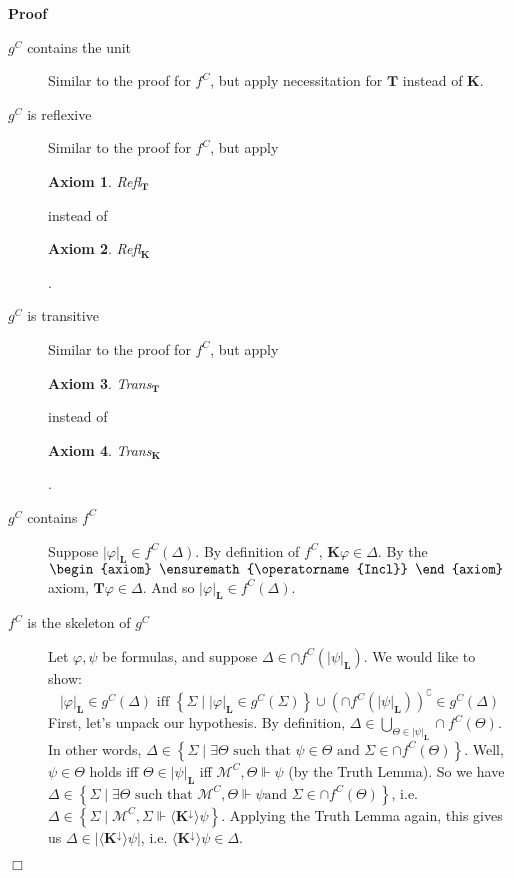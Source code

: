 \documentclass{article}
\newcommand{\infixiff}{\text{ iff }}
\newcommand{\tmmathbf}[1]{\ensuremath{\boldsymbol{#1}}}
\newcommand{\tmop}[1]{\ensuremath{\operatorname{#1}}}
\newenvironment{proof}{\noindent\textbf{Proof\ }}{\hspace*{\fill}$\Box$\medskip}
\newtheorem{axiom}{Axiom}
\providecommand{\infixiff}{\mathbin{\text{ iff }}}
\newcommand{\Model}{\ensuremath{\mathcal{M}}}
\newcommand{\Logic}{\ensuremath{\tmmathbf{\text{L}}}}
\newcommand{\Know}{\tmmathbf{\text{K}}}
\newcommand{\diaKnownby}{\langle \tmmathbf{\text{K}^{\downarrow}} \rangle}
\newcommand{\Typ}{\ensuremath{\tmmathbf{\text{T}}}}
\begin{document}
\begin{proof}
\begin{description}
    \item[$g^C$ contains the unit] Similar to the proof for $f^C$, but apply
    necessitation for $\Typ$ instead of $\Know$.
    
    \item[$g^C$ is reflexive] Similar to the proof for $f^C$, but apply
    \begin{axiom}
      Refl$_{\Typ}$
    \end{axiom} instead of \begin{axiom}
      Refl$_{\Know}$
    \end{axiom}.
    
    \item[$g^C$ is transitive] Similar to the proof for $f^C$, but apply
    \begin{axiom}
      Trans$_{\Typ}$
    \end{axiom} instead of \begin{axiom}
      Trans$_{\Know}$
    \end{axiom}.
    
    \item[$g^C$ contains $f^C$] Suppose $| \varphi |_{\Logic} \in f^C
    (\Delta)$. By definition of $f^C$, $\Know \varphi \in \Delta$. By the
    $\begin{axiom}
      \tmop{Incl}
    \end{axiom}$ axiom, $\Typ \varphi \in \Delta$. And so $| \varphi
    |_{\Logic} \in f^C (\Delta)$.
    
    \item[$f^C$ is the skeleton of $g^C$] Let $\varphi, \psi$ be formulas, and
    suppose $\Delta \in \cap f^C \left( | \psi |_{\Logic} \right)$. We would
    like to show:
    \[ | \varphi |_{\Logic} \in g^C (\Delta) \infixiff \left\{ \Sigma \mid |
       \varphi |_{\Logic} \in g^C (\Sigma) \right\} \cup \left( \cap f^C
       \left( | \psi |_{\Logic} \right) \right)^{\complement} \in g^C (\Delta)
    \]
    First, let's unpack our hypothesis. By definition, $\Delta \in
    \bigcup_{\Theta \in | \psi |_{\Logic}} \cap f^C (\Theta)$. In other words,
    $\Delta \in \left\{ \Sigma \mid \exists \Theta \text{ such that } \psi \in
    \Theta \text{ and } \Sigma \in \cap f^C (\Theta) \right\}$. Well, $\psi
    \in \Theta$ holds iff $\Theta \in | \psi |_{\Logic}$ iff $\Model^C, \Theta
    \Vdash \psi$ (by the Truth Lemma). So we have $\Delta \in \left\{ \Sigma
    \mid \exists \Theta \text{ such that } \Model^C, \Theta \Vdash \psi \text{
    and } \Sigma \in \cap f^C (\Theta) \right\}$, i.e. $\Delta \in \left\{
    \Sigma \mid \Model^C, \Sigma \Vdash \diaKnownby \psi \right\}$. Applying
    the Truth Lemma again, this gives us $\Delta \in \left| \diaKnownby \psi
    \right|$, i.e. $\diaKnownby \psi \in \Delta$.
    

\end{description}
\end{proof}
\end{document}
